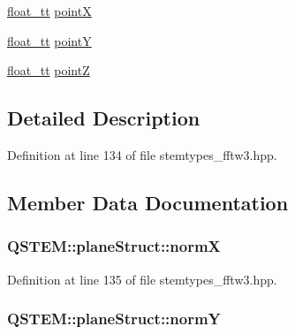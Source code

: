\begin{DoxyCompactItemize}
\item 
\hyperlink{namespace_q_s_t_e_m_a915d7caa497280d9f927c4ce8d330e47}{float\-\_\-tt} \hyperlink{struct_q_s_t_e_m_1_1plane_struct_a1952bc84ab244196aed7fb3c713df828}{point\-X}
\item 
\hyperlink{namespace_q_s_t_e_m_a915d7caa497280d9f927c4ce8d330e47}{float\-\_\-tt} \hyperlink{struct_q_s_t_e_m_1_1plane_struct_a756cf2976a00c2ed16ec84a7075f47fa}{point\-Y}
\item 
\hyperlink{namespace_q_s_t_e_m_a915d7caa497280d9f927c4ce8d330e47}{float\-\_\-tt} \hyperlink{struct_q_s_t_e_m_1_1plane_struct_a382329e60f79bb5bde993bdecd30f553}{point\-Z}
\end{DoxyCompactItemize}


\subsection{Detailed Description}


Definition at line 134 of file stemtypes\-\_\-fftw3.\-hpp.



\subsection{Member Data Documentation}
\hypertarget{struct_q_s_t_e_m_1_1plane_struct_ab580171d39c0cd8b5685fe2f2791be88}{
\subsubsection[{norm\-X}]{ Q\-S\-T\-E\-M\-::plane\-Struct\-::norm\-X}}\label{struct_q_s_t_e_m_1_1plane_struct_ab580171d39c0cd8b5685fe2f2791be88}


Definition at line 135 of file stemtypes\-\_\-fftw3.\-hpp.

\hypertarget{struct_q_s_t_e_m_1_1plane_struct_ae9d37bcf39da1062bc97c0908c6cb5a1}{
\subsubsection[{norm\-Y}]{ Q\-S\-T\-E\-M\-::plane\-Struct\-::norm\-Y}}\label{struct_q_s_t_e_m_1_1plane_struct_ae9d37bcf39da1062bc97c0908c6cb5a1}


